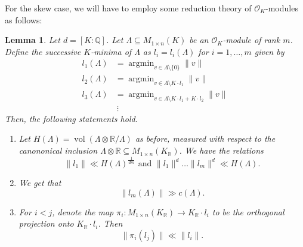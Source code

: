 \documentclass{amsart}
\newtheorem{lemma}[theorem]{Lemma}
\newcommand{\OK}{\mathcal{O}_K}
\DeclareMathOperator{\argmin}{argmin}
\DeclareMathOperator{\vol}{vol}
\begin{document}
For the skew case, 
we will have to employ some reduction theory of $\OK$-modules as follows: 
\begin{lemma}
	\label{le:props_of_minima}
	Let $d = [K:\mathbb{Q}]$.
Let $\Lambda \subseteq M_{1 \times n}(K)$ be an $\OK$-module of rank $m$. 
Define the successive $K$-minima of $\Lambda$ as
$l_i = l_i(\Lambda)$ for 
$i=1,\dots,m$ given by 
\begin{align}
	l_1(\Lambda) &  = \argmin_{v \in \Lambda \setminus \{0\} } \|v\| \\
  l_2(\Lambda)  & = \argmin_{v \in \Lambda \setminus K\cdot l_1  } \|v\| \\
  l_3(\Lambda)  & = \argmin_{v \in \Lambda \setminus K \cdot l_1 + K \cdot l_2  } \|v\| \\
		&~\vdots
\end{align}
Then, the following statements hold.
\begin{enumerate}
	\item \label{lepart:1}
		Let $H(\Lambda)  = \vol(\Lambda\otimes \mathbb{R}/ \Lambda)$ as before, measured with respect to the canononical inclusion $\Lambda\otimes \mathbb{R} \subseteq M_{1 \times n}(K_\mathbb{R})$.
   We have the relations
   \begin{equation}
     \|l_1\| \ll H(\Lambda)^{\frac{1}{dm}}
   \text{ and }
 \|l_1\|^{d} \dots  \|l_{m}\|^{d} \ll H(\Lambda).
\end{equation}

\item 
	\label{lepart:2}
	We get that 
	\begin{equation}
	  \|l_{m}(\Lambda)\| \gg c(\Lambda) .
	\end{equation}

\item \label{lepart:3}
	For $i<j$, denote the map $\pi_{i}:M_{1\times n}(K_\mathbb{R}) \rightarrow K_\mathbb{R} \cdot l_i$ 
	to be the orthogonal projection onto $K_\mathbb{R} \cdot l_i$. Then
	\begin{equation}
	  \| \pi_{i}(l_j)\| \ll \|l_i\|.
	\end{equation}

\end{enumerate}
  
\end{lemma}
\end{document}
